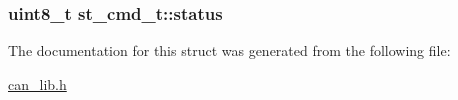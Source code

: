 \subsubsection[{\texorpdfstring{status}{status}}]{\setlength{\rightskip}{0pt plus 5cm}uint8\+\_\+t st\+\_\+cmd\+\_\+t\+::status}\hypertarget{structst__cmd__t_ab86b81f85afb26d6bd078854dda95759}{}\label{structst__cmd__t_ab86b81f85afb26d6bd078854dda95759}


The documentation for this struct was generated from the following file\+:\begin{DoxyCompactItemize}
\item 
\hyperlink{can__lib_8h}{can\+\_\+lib.\+h}\end{DoxyCompactItemize}
